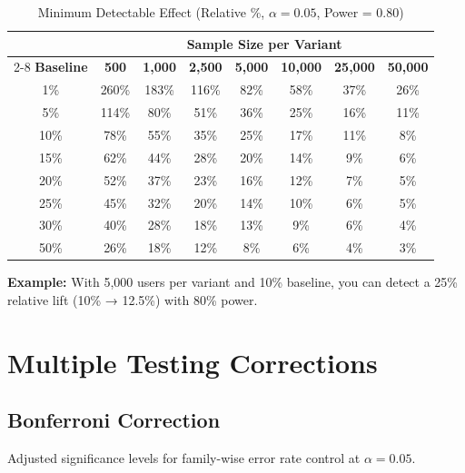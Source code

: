 \begin{table}[h]
\centering
\caption{Minimum Detectable Effect (Relative \%, $\alpha = 0.05$, Power = 0.80)}
\begin{tabular}{c|ccccccc}
\toprule
& \multicolumn{7}{c}{\textbf{Sample Size per Variant}} \\
\cmidrule{2-8}
\textbf{Baseline} & \textbf{500} & \textbf{1,000} & \textbf{2,500} & \textbf{5,000} & \textbf{10,000} & \textbf{25,000} & \textbf{50,000} \\
\midrule
1\% & 260\% & 183\% & 116\% & 82\% & 58\% & 37\% & 26\% \\
5\% & 114\% & 80\% & 51\% & 36\% & 25\% & 16\% & 11\% \\
10\% & 78\% & 55\% & 35\% & 25\% & 17\% & 11\% & 8\% \\
15\% & 62\% & 44\% & 28\% & 20\% & 14\% & 9\% & 6\% \\
20\% & 52\% & 37\% & 23\% & 16\% & 12\% & 7\% & 5\% \\
25\% & 45\% & 32\% & 20\% & 14\% & 10\% & 6\% & 5\% \\
30\% & 40\% & 28\% & 18\% & 13\% & 9\% & 6\% & 4\% \\
50\% & 26\% & 18\% & 12\% & 8\% & 6\% & 4\% & 3\% \\
\bottomrule
\end{tabular}
\end{table}

\textbf{Example:} With 5,000 users per variant and 10\% baseline, you can detect a 25\% relative lift (10\% → 12.5\%) with 80\% power.

\newpage

\section{Multiple Testing Corrections}

\subsection{Bonferroni Correction}

Adjusted significance levels for family-wise error rate control at $\alpha = 0.05$.

